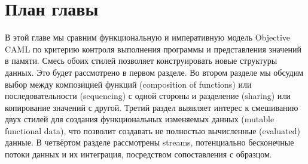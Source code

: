 \section{План главы}
\label{sec:plan_of_the_chapter_4}

В этой главе мы сравним функциональную и императивную модель Objective CAML по
критерию контроля выполнения программы и представления значений в памяти. Смесь
обоих стилей позволяет конструировать новые структуры данных. Это будет
рассмотрено в первом разделе. Во втором разделе мы обсудим выбор между
композицией функций (composition of functions) или последовательности
(sequencing) с одной стороны и разделение (sharing) или копирование значений с
другой. Третий раздел выявляет интерес к смешиванию двух стилей для создания
функциональных изменяемых данных (mutable functional data), что позволит
создавать не полностью вычисленные (evaluated) данные. В четвёртом разделе
рассмотрены streams, потенциально бесконечные потоки данных и их интеграция,
посредством сопоставления с образцом.
